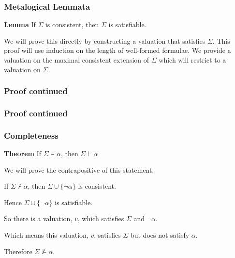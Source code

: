 \documentclass{beamer}
\theoremstyle{indentDefn} \newtheorem{defn}[]{Definition}
\begin{document}
\begin{frame}
	\frametitle{Metalogical Lemmata}
	
	{\bf Lemma} If $\Sigma$ is consistent, then $\Sigma$ is satisfiable.
	
	\vspace{0.5cm}
	
	 We will prove this directly by constructing a valuation that satisfies $\Sigma$. This proof will use induction on the length of well-formed formulae. We provide a valuation on the maximal consistent extension of $\Sigma$ which will restrict to a valuation on $\Sigma$. 
	
	\vspace{5cm}
	
\end{frame}

\begin{frame}
	\frametitle{Proof continued}
\end{frame}

\begin{frame}
	\frametitle{Proof continued}
\end{frame}

\begin{frame}
	\frametitle{Completeness}
	
	{\bf Theorem} If $\Sigma \vDash \alpha $, then $\Sigma \vdash \alpha $
	
	\vspace{0.5cm}
	
	 We will prove the contrapositive of this statement. 
	
	\vspace{0.2cm}
	If $\Sigma \nvdash \alpha$, then $\Sigma \cup \{\lnot\alpha\}$ is consistent. %
	
	\vspace{0.3cm}
	Hence $\Sigma \cup \{\lnot\alpha\}$ is satisfiable.
	
	\vspace{0.3cm}
	So there is a valuation, $v$, which satisfies $\Sigma$ and $\lnot\alpha$.
	
	\vspace{0.3cm}
	Which means this valuation, $v$, satisfies $\Sigma$ but does not satisfy $\alpha$.
	
	\vspace{0.3cm}
	Therefore $\Sigma \nvDash \alpha$. 
	
	
\end{frame}
\end{document}
